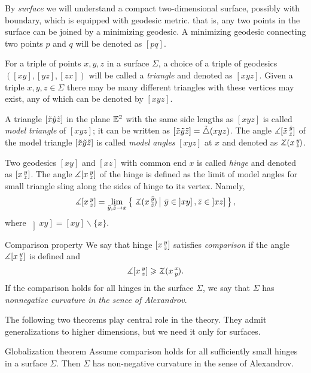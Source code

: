 \documentclass[oneside,a4paper, 12pt]{article}
\begin{document}
By \emph{surface} we will understand a compact two-dimensional surface, possibly with boundary, which is equipped with geodesic metric.
that is, any two points in the surface can be joined by a minimizing geodesic.
A minimizing geodesic connecting two points $p$ and $q$ will be denoted as $[pq]$.

For a triple of points $x,y,z$ in a surface $\Sigma$, a choice of a triple of geodesics $([x y], [y z], [z x])$ will be called a \emph{triangle} 
and denoted as 
$[x y z]$.
Given a triple $x,y,z\in \Sigma$ there may be many different triangles with these vertices may exist, any of which can be denoted by $[x y z]$.

A triangle $[\~x\~y\~z]$ in the plane $\EE^2$
with the same side lengths as $[x y z]$ 
is called \emph{model triangle} of $[x y z]$;
it can be written as $[\~x\~y\~z]=\~\triangle(x y z)$.
The angle $\mangle\hinge{\~x}{\~y}{\~z}$ of the model triangle $[\~x\~y\~z]$ is called \emph{model angles} $[x y z]$ at $x$ and denoted as $\angk x y z$.


Two geodesics $[xy]$ and $[xz]$ with common end $x$ is called \emph{hinge} and denoted as $\hinge{x}{y}{z}$.
The angle $\mangle\hinge{x}{y}{z}$ of the hinge is defined as the limit of model angles for small triangle sling along the sides of hinge to its vertex. Namely,
\[\mangle\hinge{x}{y}{z}=\lim_{\bar y,\bar z\to x}\set{\angk{x}{\bar y}{\bar z}}{ \bar y\in \left]xy\right], \bar z\in \left]xz\right]},\]
where $\left]xy\right]=[xy]\backslash\{x\}$.

\begin{thm}{Comparison property}
We say that hinge $\hinge x y z$ 
satisfies \emph{comparison} if the angle
$\mangle\hinge{x}{y}{z}$ is defined and 
\[\mangle \hinge{x}{y}{z} \ge \angk{x}{x}{y}{}{}.\]
If the comparison holds for all hinges in the surface $\Sigma$,
we say that $\Sigma$
has \emph{nonnegative curvature in the sence of Alexandrov}.
\end{thm}

The following two theorems play central role in the theory.
They admit generalizations to higher dimensions, but we need it only for surfaces.

\begin{thm}{Globalization theorem}
Assume comparison holds for all sufficiently small hinges in a surface $\Sigma$.
Then $\Sigma$ has non-negative curvature in the sense of Alexandrov.
\end{thm}
\end{document}
